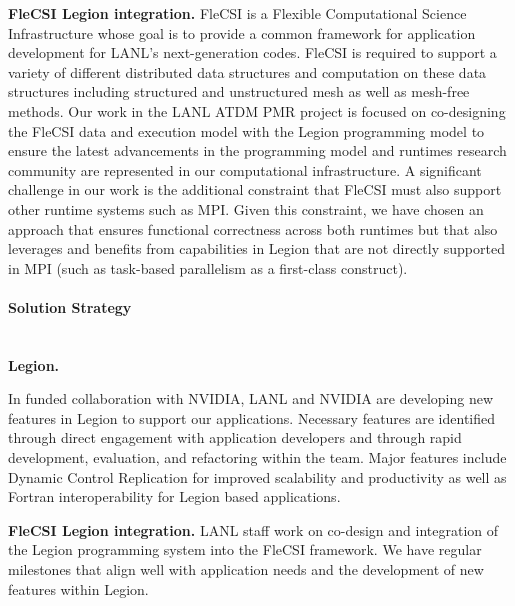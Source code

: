 \textbf{FleCSI Legion integration.}
FleCSI is a Flexible Computational Science Infrastructure whose goal is to provide a common framework for application development for LANL's next-generation codes. FleCSI is required to support a variety of different distributed data structures and computation on these data structures including structured and unstructured mesh as well as mesh-free methods. Our work in the LANL ATDM PMR project is focused on co-designing the FleCSI data and execution model with the Legion programming model to ensure the latest advancements in the programming model and runtimes research community are represented in our computational infrastructure. A significant challenge in our work is the additional constraint that FleCSI must also support other runtime systems such as MPI. Given this constraint, we have chosen an approach that ensures functional correctness across both runtimes but that also leverages and benefits from capabilities in Legion that are not directly supported in MPI (such as task-based parallelism as a first-class construct). 

\paragraph{Solution Strategy} \leavevmode \\
 

\textbf{Legion.}

In funded collaboration with NVIDIA, LANL and NVIDIA are developing new features in Legion to support our applications. Necessary features are identified through direct engagement with application developers and through rapid development, evaluation, and refactoring within the team. Major features include Dynamic Control Replication for improved scalability and productivity as well as Fortran interoperability for Legion based applications. 


\textbf{FleCSI Legion integration.}
LANL staff work on co-design and integration of the Legion programming system into the FleCSI framework. We have regular milestones that align well with application needs and the development of new features within Legion. 

